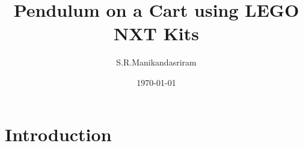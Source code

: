 \documentclass[aspectratio=169]{beamer}
\title[Crane]{Pendulum on a Cart using LEGO NXT Kits} %
\author{S.R.Manikandasriram} %
\institute[IITM] %
{
Indian Institute of Technology, Madras \\ %
\medskip
\textit{srmanikandasriram@gmail.com} %
}
\date{\today} %
\begin{document}
\begin{frame}
\titlepage %
\end{frame}



\section{Introduction} %

\end{document}
